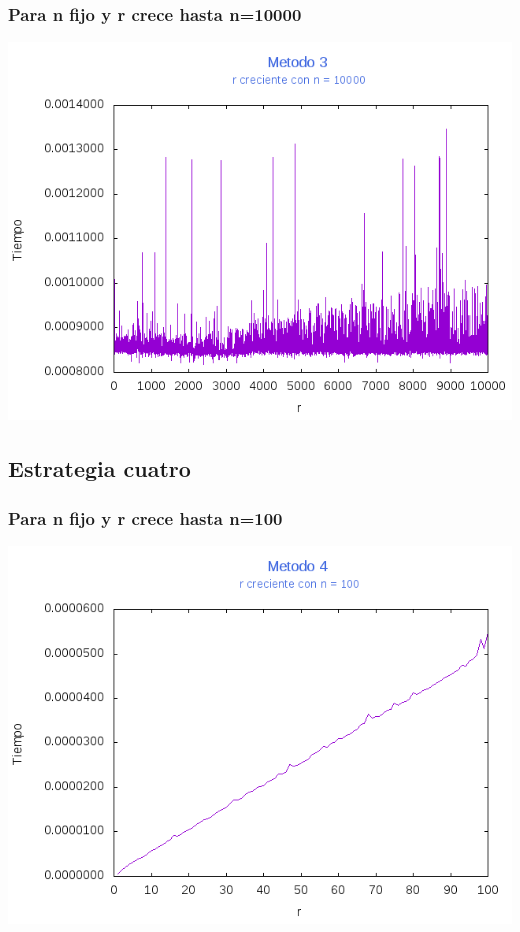 \documentclass[12pt,letterpaper]{scrartcl}
\begin{document}
\subsubsection{Para n fijo y r crece hasta n=10000}
\includegraphics[scale=1]{Metodo3/plot10000m3}
\newpage
\subsection{Estrategia cuatro}

\subsubsection{Para n fijo y r crece hasta n=100}
\includegraphics[scale=1]{Metodo4/plot100m4}
\end{document}
